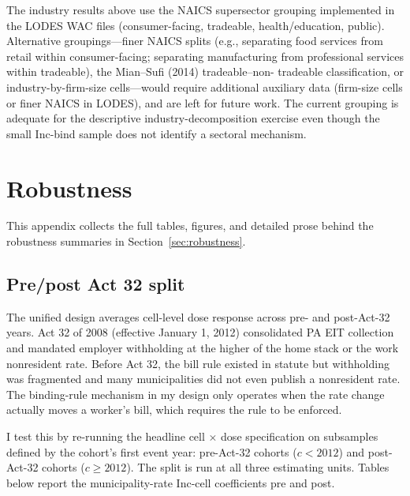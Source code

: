 \documentclass[12pt]{article}
\begin{document}
The industry results above use the NAICS supersector grouping
implemented in the LODES WAC files (consumer-facing, tradeable,
health/education, public). Alternative groupings---finer NAICS
splits (e.g., separating food services from retail within
consumer-facing; separating manufacturing from professional
services within tradeable), the Mian--Sufi (2014) tradeable--non-
tradeable classification, or industry-by-firm-size cells---would
require additional auxiliary data (firm-size cells or finer NAICS in
LODES), and are left for future work. The current grouping is
adequate for the descriptive industry-decomposition exercise even
though the small Inc-bind sample does not identify a sectoral
mechanism.

\section{Robustness}
\label{app:robustness}

This appendix collects the full tables, figures, and detailed prose
behind the robustness summaries in Section~\ref{sec:robustness}.

\subsection{Pre/post Act 32 split}
\label{app:rob-act32}

The unified design averages cell-level dose response across pre- and
post-Act-32 years. Act 32 of 2008 (effective January 1, 2012) consolidated
PA EIT collection and mandated employer withholding at the higher of the
home stack or the work nonresident rate. Before Act 32, the bill rule
existed in statute but withholding was fragmented and many municipalities did
not even publish a nonresident rate. The binding-rule mechanism in my
design only operates when the rate change actually moves a worker's bill,
which requires the rule to be enforced.

I test this by re-running the headline cell $\times$ dose specification
on subsamples defined by the cohort's first event year: pre-Act-32
cohorts ($c < 2012$) and post-Act-32 cohorts ($c \geq 2012$). The split
is run at all three estimating units. Tables below report the municipality-rate
Inc-cell coefficients pre and post.




\end{document}
